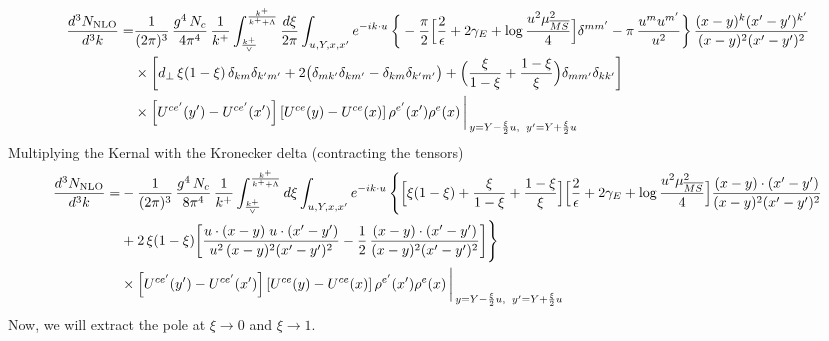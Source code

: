 \documentclass[9pt]{article}
\numberwithin{equation}{section}
\begin{document}
\begin{align}
\frac{d^{3}N_{\rm NLO}}{d^{3}k}= &\frac{1}{(2\pi)^{3}}\,\frac{g^{4}\,N_{c}}{4\pi^{4}}\,\frac{1}{k^{+}}\int_{\frac{k^{+}}{\vee}}^{\frac{k^{+}}{k^{+}+\Lambda}}\frac{d\xi}{2\pi}\int_{u,Y,x,x'}e^{-ik\cdot u}\,
\bigg\{-\frac{\pi}{2}\Big[\frac{2}{\epsilon}+2\gamma_{E}+\log\frac{u^{2}\mu^{2}_{\overline{MS}}}{4}\Big]\delta^{mm'}-\pi\,\frac{u^{m}u^{m'}}{u^{2}}\bigg\}\,\frac{(x-y)^{k}(x'-y')^{k'}}{(x-y)^{2}(x'-y')^{2}}\notag\\
&\times\bigg[d_{\perp}\,\xi(1-\xi)\,\delta_{km}\delta_{k'm'}+2\big(\delta_{mk'}\delta_{km'}-\delta_{km}\delta_{k'm'}\big)+\Big(\frac{\xi}{1-\xi}+\frac{1-\xi}{\xi}\Big)\delta_{mm'}\delta_{kk'}\bigg]\notag\\
&\times\left[U^{ce'}(y') - U^{ce'}(x')\right]\left[U^{ce}(y) - U^{ce}(x)\right]\rho^{e'}(x')\rho^{e}(x)\,\bigg|_{\,y=Y-\frac{\xi}{2}u,\;\;y'=Y+\frac{\xi}{2}u}
\end{align}
Multiplying the Kernal with the Kronecker delta (contracting the tensors)
\begin{align}
\frac{d^{3}N_{\rm NLO}}{d^{3}k}= &-\frac{1}{(2\pi)^{3}}\,\frac{g^{4}\,N_{c}}{8\pi^{4}}\,\frac{1}{k^{+}}\int_{\frac{k^{+}}{\vee}}^{\frac{k^{+}}{k^{+}+\Lambda}}d\xi\int_{u,Y,x,x'}e^{-ik\cdot u}\,
\Bigg\{\Big[\xi(1-\xi)+\frac{\xi}{1-\xi}+\frac{1-\xi}{\xi}\Big]\Big[\frac{2}{\epsilon}+2\gamma_{E}+\log\frac{u^{2}\mu^{2}_{\overline{MS}}}{4}\Big]\frac{(x-y)\cdot(x'-y')}{(x-y)^{2}(x'-y')^{2}}\notag\\
&+2\,\xi(1-\xi)\bigg[\frac{u\cdot(x-y)\;u\cdot(x'-y')}{u^{2}\,(x-y)^{2}(x'-y')^{2}}-\frac{1}{2}\,\frac{(x-y)\cdot(x'-y')}{(x-y)^{2}(x'-y')^{2}}\bigg]\Bigg\}\notag\\
&\times\left[U^{ce'}(y') - U^{ce'}(x')\right]\left[U^{ce}(y) - U^{ce}(x)\right]\rho^{e'}(x')\rho^{e}(x)\,\bigg|_{\,y=Y-\frac{\xi}{2}u,\;\;y'=Y+\frac{\xi}{2}u}
\end{align}
Now, we will extract the pole at $\xi\to 0$ and $\xi \to 1$. 
\end{document}
